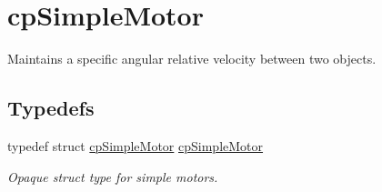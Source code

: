 \hypertarget{group__cp_simple_motor}{}\section{cp\+Simple\+Motor}
\label{group__cp_simple_motor}


Maintains a specific angular relative velocity between two objects.  


\subsection*{Typedefs}
\begin{DoxyCompactItemize}
\item 
\hypertarget{group__cp_simple_motor_ga0b1689742ce8e31d9a4b3bcae83db2e7}{}typedef struct \hyperlink{structcp_simple_motor}{cp\+Simple\+Motor} \hyperlink{group__cp_simple_motor_ga0b1689742ce8e31d9a4b3bcae83db2e7}{cp\+Simple\+Motor}\label{group__cp_simple_motor_ga0b1689742ce8e31d9a4b3bcae83db2e7}

\begin{DoxyCompactList}\small\item\em Opaque struct type for simple motors. \end{DoxyCompactList}\end{DoxyCompactItemize}
